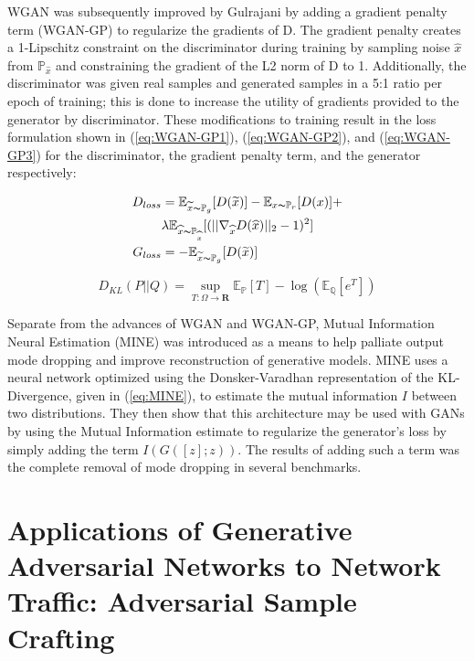 \documentclass[12pt,american]{report}
\def\Reals{\mathbf{R}}
\def\E{\mathbb{E}}
\def\Q{\mathbb{Q}}
\def\P{\mathbb{P}}
\begin{document}
WGAN was subsequently improved by Gulrajani \etal \cite{Gulrajani2017} by adding a gradient penalty term (WGAN-GP) to regularize the gradients of D. The gradient penalty creates a 1-Lipschitz constraint on the discriminator during training by sampling noise $\widehat{x}$ from $\P_{\widehat{x}}$ and constraining the gradient of the L2 norm of D to 1. Additionally, the discriminator was given real samples and generated samples in a 5:1 ratio per epoch of training; this is done to increase the utility of gradients provided to the generator by discriminator. These modifications to training result in the loss formulation shown in (\ref{eq:WGAN-GP1}), (\ref{eq:WGAN-GP2}), and (\ref{eq:WGAN-GP3}) for the discriminator, the gradient penalty term, and the generator respectively:

\begin{align}
	D_{loss} &=  \E_{\widetilde{x} \thicksim \P_g}[D(\widetilde{x})] - \E_{x \thicksim \P_r}[D(x)] + \label{eq:WGAN-GP1} \\
	& \lambda \E_{\widehat{x} \thicksim \P_{\widehat{x}}}[(||\nabla_{\widehat{x}} D(\widehat{x})||_2 -1)^2] \label{eq:WGAN-GP2}\\
	G_{loss} &=  -\E_{\widetilde{x} \thicksim \P_g}[D(\widetilde{x})] \label{eq:WGAN-GP3}
\end{align}

\begin{equation}
	D_{KL}(P||Q) = \sup\limits_{T:\Omega \rightarrow \Reals} \E_\P[T] - \log(\E_\Q[e^T])
	\label{eq:MINE}
\end{equation}

Separate from the advances of WGAN and WGAN-GP, Mutual Information Neural Estimation (MINE) \cite{Belghazi2018} was introduced as a means to help palliate output mode dropping and improve reconstruction of generative models. MINE uses a neural network optimized using the Donsker-Varadhan representation of the KL-Divergence, given in (\ref{eq:MINE}), to estimate the mutual information $I$ between two distributions. They then show that this architecture may be used with GANs by using the Mutual Information estimate to regularize the generator's loss by simply adding the term $I(G([z];z))$. The results of adding such a term was the complete removal of mode dropping in several benchmarks.

\section{Applications of Generative Adversarial Networks to Network Traffic: Adversarial Sample Crafting}
\end{document}
